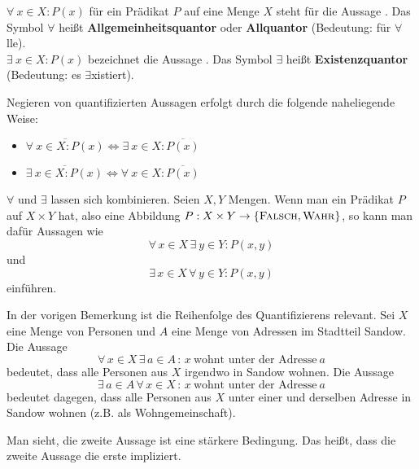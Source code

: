 \begin{defn}
$ \forall\: x \in X : P(x) $ für ein Prädikat $ P $ auf eine Menge $ X $ steht für die Aussage . Das Symbol $ \forall $ heißt \textbf{Allgemeinheitsquantor} oder \textbf{Allquantor} (Bedeutung: für $ \forall $lle). \\[10pt]
%
$ \exists\: x \in X : P(x) $ bezeichnet die Aussage . Das Symbol $ \exists $ heißt \textbf{Existenzquantor} (Bedeutung: es $ \exists $xistiert).
\end{defn}

\begin{bem}
	Negieren von quantifizierten Aussagen erfolgt durch die folgende naheliegende Weise: 
	\begin{itemize}
		\item $ \overline{\forall\: x \in X : P(x)} \Leftrightarrow \exists\: x \in X : \overline{P(x)} $
		\item $ \overline{\exists\: x \in X : P(x)} \Leftrightarrow \forall\: x \in X : \overline{P(x)} $
	\end{itemize}
\end{bem}


\begin{bem}
	$ \forall $ und $ \exists $ lassen sich kombinieren. Seien $X, Y$ Mengen. Wenn man ein Prädikat $ P $ auf $ X \times Y $ hat, also eine Abbildung $P : X \times Y \to \{\mathop{\text{\textsc{Falsch}}},\mathop{\text{\textsc{Wahr}}}\}$, so kann man dafür Aussagen wie
	\[
		 \forall\, x \in X \,\exists\: y \in Y : P(x,y)
	\]
	und
	\[\exists\, x \in X  \, \forall\, y \in Y : P(x,y) 
	\]
	einführen. 
\end{bem}


\begin{bem}
	In der vorigen Bemerkung ist die Reihenfolge des Quantifizierens relevant. Sei $X$ eine Menge von  Personen und $A$ eine Menge von Adressen im Stadtteil Sandow. Die Aussage 
	\[
		\forall\, x \in X \, \exists\, a \in A \, :\, x \ \text{wohnt unter der Adresse} \  a
	\]
	bedeutet, dass alle Personen aus $X$ irgendwo in Sandow wohnen. Die Aussage 
	\[
		\exists\, a \in A \, \forall\, x \in X \,:\, x \ \text{wohnt unter der Adresse} \ a
	\]
	bedeutet dagegen, dass alle Personen aus $X$ unter einer und derselben Adresse in Sandow wohnen (z.B. als Wohngemeinschaft).
	
	Man sieht, die zweite Aussage ist eine stärkere Bedingung.
	Das hei\ss t, dass die zweite Aussage die erste impliziert.
\end{bem} 

